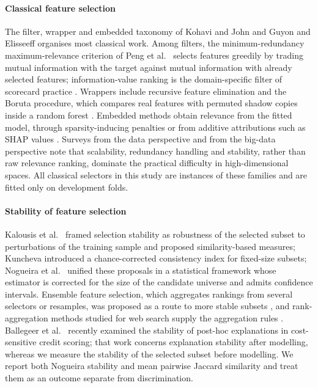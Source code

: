 \documentclass[preprint,12pt]{elsarticle}
\begin{document}
\paragraph{Classical feature selection}
The filter, wrapper and embedded taxonomy of Kohavi and John \cite{kohavi1997} and Guyon and Elisseeff \cite{guyon2003} organises most classical work. Among filters, the minimum-redundancy maximum-relevance criterion of Peng et al.\ \cite{peng2005} selects features greedily by trading mutual information with the target against mutual information with already selected features; information-value ranking is the domain-specific filter of scorecard practice \cite{siddiqi2006,thomas2002}. Wrappers include recursive feature elimination \cite{guyon2002} and the Boruta procedure, which compares real features with permuted shadow copies inside a random forest \cite{kursa2010,breiman2001}. Embedded methods obtain relevance from the fitted model, through sparsity-inducing penalties \cite{tibshirani1996} or from additive attributions such as SHAP values \cite{lundberg2017}. Surveys from the data perspective \cite{li2017survey,saeys2007} and from the big-data perspective \cite{boloncanedo2015} note that scalability, redundancy handling and stability, rather than raw relevance ranking, dominate the practical difficulty in high-dimensional spaces. All classical selectors in this study are instances of these families and are fitted only on development folds.

\paragraph{Stability of feature selection}
Kalousis et al.\ \cite{kalousis2007} framed selection stability as robustness of the selected subset to perturbations of the training sample and proposed similarity-based measures; Kuncheva \cite{kuncheva2007} introduced a chance-corrected consistency index for fixed-size subsets; Nogueira et al.\ \cite{nogueira2018} unified these proposals in a statistical framework whose estimator is corrected for the size of the candidate universe and admits confidence intervals. Ensemble feature selection, which aggregates rankings from several selectors or resamples, was proposed as a route to more stable subsets \cite{saeys2008,boloncanedo2019}, and rank-aggregation methods studied for web search supply the aggregation rules \cite{dwork2001}. Ballegeer et al.\ \cite{ballegeer2025} recently examined the stability of post-hoc explanations in cost-sensitive credit scoring; that work concerns explanation stability after modelling, whereas we measure the stability of the selected subset before modelling. We report both Nogueira stability and mean pairwise Jaccard similarity and treat them as an outcome separate from discrimination.
\end{document}
